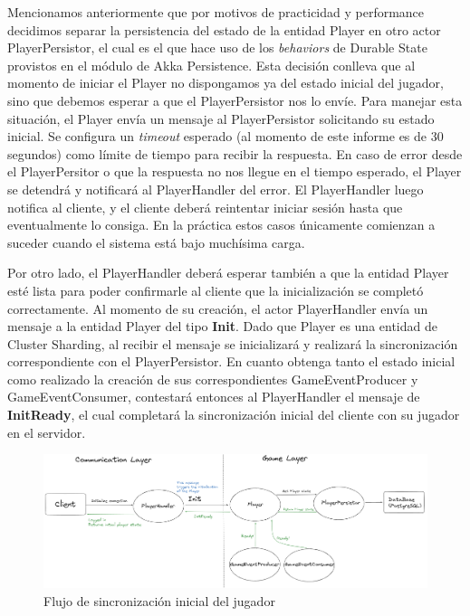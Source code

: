 \noindent Mencionamos anteriormente que por motivos de practicidad y performance decidimos separar la persistencia del estado de la entidad Player en otro actor PlayerPersistor, el cual
es el que hace uso de los \textit{behaviors} de Durable State provistos en el módulo de Akka Persistence. Esta decisión conlleva que al momento de iniciar el Player no dispongamos ya del estado
inicial del jugador, sino que debemos esperar a que el PlayerPersistor nos lo envíe. Para manejar esta situación, el Player envía un mensaje al PlayerPersistor solicitando su estado inicial.
Se configura un \textit{timeout} esperado (al momento de este informe es de 30 segundos) como límite de tiempo para recibir la respuesta. En caso de error desde el PlayerPersitor o que la respuesta no
nos llegue en el tiempo esperado, el Player se detendrá y notificará al PlayerHandler del error. El PlayerHandler luego notifica al cliente, y el cliente deberá reintentar iniciar sesión hasta que eventualmente
lo consiga. En la práctica estos casos únicamente comienzan a suceder cuando el sistema está bajo muchísima carga.

Por otro lado, el PlayerHandler deberá esperar también a que la entidad Player esté lista para poder confirmarle al cliente que la inicialización se completó correctamente. Al momento de su creación, el actor PlayerHandler
envía un mensaje a la entidad Player del tipo \textbf{Init}. Dado que Player es una entidad de Cluster Sharding, al recibir el mensaje se inicializará y realizará la sincronización correspondiente con el PlayerPersistor. En cuanto
obtenga tanto el estado inicial como realizado la creación de sus correspondientes GameEventProducer y GameEventConsumer, contestará entonces al PlayerHandler el mensaje de \textbf{InitReady}, el cual completará la sincronización inicial
del cliente con su jugador en el servidor.

\newpage

\begin{figure}[htbp]
    \centering
    \includegraphics[width=1\textwidth]{../assets/player-init-sync.png}
    \caption{Flujo de sincronización inicial del jugador}
\end{figure}

